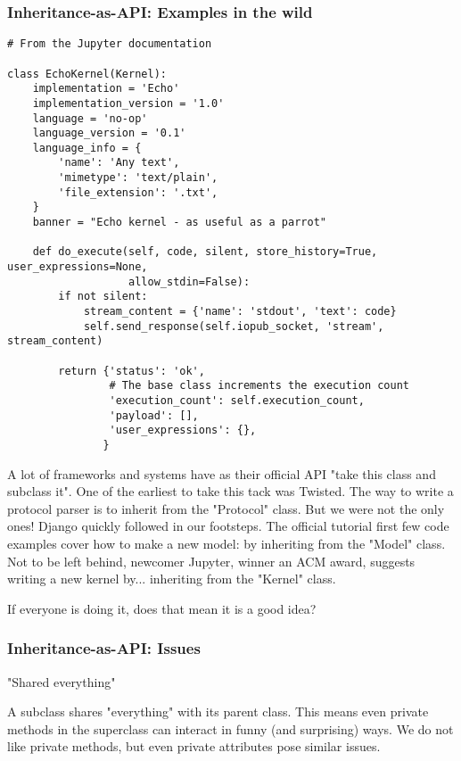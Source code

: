 \documentclass[ignorenonframetext,aspectration=169]{beamer}
\begin{document}
\begin{frame}[fragile]
\frametitle{Inheritance-as-API: Examples in the wild}

\begin{lstlisting}
# From the Jupyter documentation

class EchoKernel(Kernel):
    implementation = 'Echo'
    implementation_version = '1.0'
    language = 'no-op'
    language_version = '0.1'
    language_info = {
        'name': 'Any text',
        'mimetype': 'text/plain',
        'file_extension': '.txt',
    }
    banner = "Echo kernel - as useful as a parrot"

    def do_execute(self, code, silent, store_history=True, user_expressions=None,
                   allow_stdin=False):
        if not silent:
            stream_content = {'name': 'stdout', 'text': code}
            self.send_response(self.iopub_socket, 'stream', stream_content)

        return {'status': 'ok',
                # The base class increments the execution count
                'execution_count': self.execution_count,
                'payload': [],
                'user_expressions': {},
               }
\end{lstlisting}

\end{frame}

A lot of frameworks and systems have as their official API
"take this class and subclass it".
One of the earliest to take this tack was Twisted.
The way to write a protocol parser is to inherit from the
"Protocol"
class.
But we were not the only ones!
Django quickly followed in our footsteps.
The official tutorial first few code examples
cover how to make a new model:
by inheriting from the
"Model"
class.
Not to be left behind,
newcomer Jupyter,
winner an ACM award,
suggests writing a new kernel
by...
inheriting from the
"Kernel"
class.

If everyone is doing it,
does that mean it is a good idea?

\begin{frame}[fragile]
\frametitle{Inheritance-as-API: Issues}

"Shared everything"
\end{frame}

A subclass shares
"everything"
with its parent class.
This means even private methods in the superclass
can interact in funny
(and surprising)
ways.
We do not like private methods,
but even private attributes pose similar issues.
\end{document}
